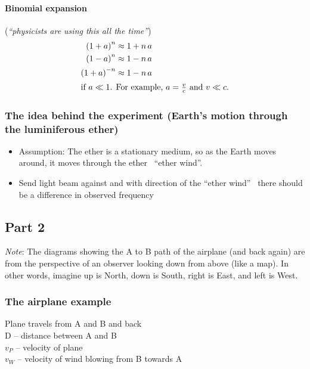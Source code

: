 \documentclass[pagesize,headsepline,10pt,parskip=half]{scrreprt}
\newcommand{\const}[1]{\ensuremath{\mathrm{#1}}}
\renewcommand{\c}{\const{c}}
\begin{document}
          \paragraph{Binomial expansion}\label{eq:binomial-expansion}
            (\emph{“physicists are using this all the time”})
            \begin{align*}
              {\left(1 + a\right)}^n &\approx 1 + n \, a\\
              {\left(1 - a\right)}^n &\approx 1 - n \, a\\
              {\left(1 + a\right)}^{-n} &\approx 1 - n \, a\\
              \intertext{if $a \ll 1$. For example, $a = \frac{v}{\c}$ and $v \ll c$.}
            \end{align*}
        \subsubsection{The idea behind the experiment (Earth’s motion through the luminiferous ether)}
          \begin{itemize}
            \item Assumption: The ether is a stationary medium, so as the Earth moves around, it moves through the ether
              \rightarrow~“ether wind”.
            \item Send light beam against and with direction of the “ether wind”
              \rightarrow~there should be a difference in observed frequency
          \end{itemize}

      \subsection{Part 2}
        \emph{Note}: The diagrams showing the A to B path of the airplane (and back again) are from the perspective of
        an observer looking down from above (like a map). In other words, imagine up is North, down is South,
        right is East, and left is West.

        \subsubsection{The airplane example}
          Plane travels from A and B and back\\
          D – distance between A and B\\
          $v_P$ – velocity of plane\\
          $v_W$ – velocity of wind blowing from B towards A\\
\end{document}
